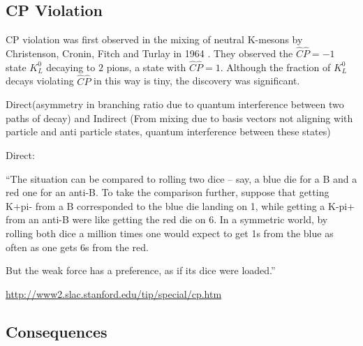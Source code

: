 \subsection{CP Violation}

CP violation was first observed in the mixing of neutral K-mesons by Christenson, Cronin, Fitch and Turlay in 1964 \cite{FirstCPV}. They observed the $\hat{C}\hat{P} = -1$ state $K^{0}_L$ decaying to $2$ pions, a state with $\hat{C}\hat{P} = 1$. Although the fraction of $K^{0}_L$ decays violating $\hat{C}\hat{P}$ in this way is tiny, the discovery was significant.     

Direct(asymmetry in branching ratio due to quantum interference between two paths of decay) and Indirect (From mixing due to basis vectors not aligning with particle and anti particle states, quantum interference between these states)

Direct:

``The situation can be compared to rolling two dice – say, a blue die for a B and a red one for an anti-B.  To take the comparison further, suppose that getting K+pi- from a B corresponded to the blue die landing on 1, while getting a K-pi+ from an anti-B were like getting the red die on 6. In a symmetric world, by rolling both dice a million times one would expect to get 1s from the blue as often as one gets 6s from the red.

But the weak force has a preference, as if its dice were loaded.''

\url{http://www2.slac.stanford.edu/tip/special/cp.htm}


\subsection{Consequences}
